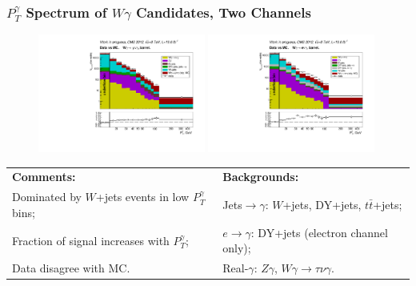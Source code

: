 \begin{frame}\frametitle{$P_T^{\gamma}$ Spectrum of $W\gamma$ Candidates, Two Channels}
  \begin{figure}[htb]
    \begin{center}
       \includegraphics[width=0.49\textwidth]{../figs/figs_v11/MUON_WGamma/PrepareYields/c_TotalDATAvsMC_Barrel__phoEt.pdf} \includegraphics[width=0.49\textwidth]{../figs/figs_v11/ELECTRON_WGamma/PrepareYields/c_TotalDATAvsMC_Barrel__phoEt.pdf} 
    \end{center}
  \end{figure}

\tiny
  \begin{table}[h]
     \tiny
     \begin{center}
     \begin{tabular}{|l|l|}
     \hline
     {\bfseries{Comments:}} &  {\bfseries{ Backgrounds:}}\\ 
     Dominated by $W$+jets events in low $P_T^{\gamma}$ bins; & Jets$\rightarrow\gamma$: $W$+jets, DY+jets, $t\bar{t}$+jets;\\
     Fraction of signal increases with $P_T^{\gamma}$; & $e\rightarrow\gamma$: DY+jets (electron channel only);\\
     Data disagree with MC.          & Real-$\gamma$: $Z\gamma$, $W\gamma\rightarrow\tau\nu\gamma$.\\
     \hline
      \end{tabular}
      \end{center}
  \end{table}

\end{frame}

